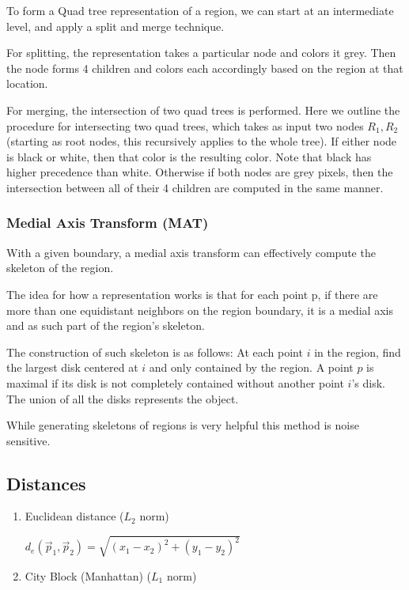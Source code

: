 \documentclass{article}
\begin{document}
\begin{multicols}{2}
To form a Quad tree representation of a region, we can start at an intermediate level, and apply a split and merge technique. 

For splitting, the representation takes a particular node and colors it grey. Then the node forms 4 children and colors each accordingly based on the region at that location. 

For merging, the intersection of two quad trees is performed. Here we outline the procedure for intersecting two quad trees, which takes as input two nodes $R_1, R_2$ (starting as root nodes, this recursively applies to the whole tree). If either node is black or white, then that color is the resulting color. Note that black has higher precedence than white. Otherwise if both nodes are grey pixels, then the intersection between all of their 4 children are computed in the same manner.

\subsubsection{Medial Axis Transform (MAT)}

With a given boundary, a medial axis transform can effectively compute the skeleton of the region.

The idea for how a representation works is that for each point p, if there are more than one equidistant neighbors on the region boundary, it is a medial axis and as such part of the region's skeleton.

The construction of such skeleton is as follows: At each point $i$ in the region, find the largest disk centered at $i$ and only contained by the region. A point $p$ is maximal if its disk is not completely contained without another point $i$'s disk. The union of all the disks represents the object.

While generating skeletons of regions is very helpful this method is noise sensitive.

\subsection{Distances}

\begin{enumerate}
  \item {Euclidean distance ($L_2$ norm)}
  
  $d_e(\vec p_1, \vec p_2) = \sqrt{(x_1 - x_2)^2 + (y_1 - y_2)^2}$

  \item {City Block (Manhattan) ($L_1$ norm)}
  

\end{enumerate}
\end{multicols}
\end{document}
